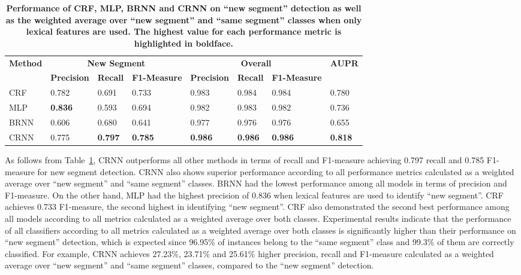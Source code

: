 \documentclass{amia}
\begin{document}
\begin{table}[ht]
\centering
\caption{\textbf{Performance of CRF, MLP, BRNN and CRNN on ``new segment'' detection as well as the weighted average over ``new segment'' and ``same segment'' classes when only lexical features are used. The highest value for each performance metric is highlighted in boldface.}}
\label{tab:result_base}
  \begin{tabular}{|l|l|l|l|l|l|l|l|}
  \hline
   \multirow{2}{*}{\textbf{Method}} & \multicolumn{3}{|c|}{\textbf{New Segment}} & \multicolumn{3}{|c|}{\textbf{Overall}} & \multirow{2}{*}{\textbf{AUPR}} \\\cline{2-7}
   & \textbf{Precision}  & \textbf{Recall} & \textbf{F1-Measure} & \textbf{Precision}  & \textbf{Recall} & \textbf{F1-Measure} & \\ \hline    
 CRF & 0.782 & 0.691 & 0.733 & 0.983 & 0.984 & 0.984 & 0.780\\ \hline
 MLP & \textbf{0.836} & 0.593 & 0.694 & 0.982 & 0.983 & 0.982 & 0.736 \\ \hline
 BRNN & 0.606 & 0.680 & 0.641 & 0.977 & 0.976 & 0.976 & 0.655\\ \hline
 CRNN & 0.775 & \textbf{0.797} & \textbf{0.785} & \textbf{0.986} & \textbf{0.986} & \textbf{0.986} & \textbf{0.818} \\ \hline
  \end{tabular}
\end{table}                              

As follows from Table~\ref{tab:result_base}, CRNN outperforms all other methods in terms of recall and F1-measure achieving 0.797 recall and 0.785 F1-measure for new segment detection. CRNN also shows superior performance according to all performance metrics calculated as a weighted average over ``new segment'' and ``same segment'' classes. BRNN had the lowest performance among all models in terms of precision and F1-measure. On the other hand, MLP had the highest precision of 0.836 when lexical features are used to identify ``new segment''. CRF achieves 0.733 F1-measure, the second highest in identifying ``new segment''. CRF also demonstrated the second best performance among all models according to all metrics calculated as a weighted average over both classes. Experimental results indicate that the performance of all classifiers according to all metrics calculated as a weighted average over both classes is significantly higher than their performance on ``new segment'' detection, which is expected since 96.95\% of instances belong to the ``same segment'' class and 99.3\% of them are correctly classified. For example, CRNN achieves 27.23\%, 23.71\% and 25.61\% higher precision, recall and F1-measure calculated as a weighted average over ``new segment'' and ``same segment'' classes, compared to the ``new segment'' detection.
\end{document}

